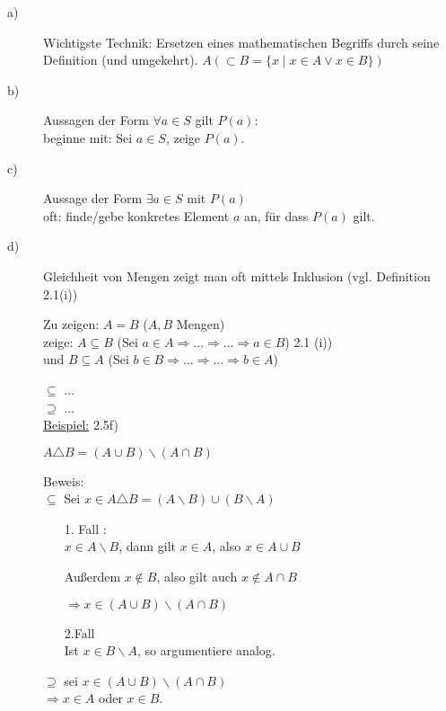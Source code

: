 \documentclass[a4paper, 12pt, twoside] {article}
\begin{document}
\begin{description}
\item[a)]
Wichtigste Technik: Ersetzen eines mathematischen Begriffs durch seine Definition (und umgekehrt).
$A( \subset B = \{x \mid x \in A \lor x \in B\})$

\item[b)]
Aussagen der Form $\forall a \in S$ gilt $P(a)$: \\
beginne mit: Sei $a \in S$, zeige $P(a)$.

\item[c)]
Aussage der Form $\exists a \in S$ mit $P(a)$ \\
oft: finde/gebe konkretes Element $a$ an, für dass $P(a)$ gilt.

\item[d)]
Gleichheit von Mengen zeigt man oft mittels Inklusion (vgl. Definition 2.1(i))

Zu zeigen: $A = B$ ($A, B$ Mengen) \\
zeige: $A \subseteq B$ (Sei $a \in A \Rightarrow ... \Rightarrow ... \Rightarrow a \in B$) 2.1 (i)) \\
und $B \subseteq A$ (Sei $b \in B \Rightarrow ... \Rightarrow ... \Rightarrow b \in A$)

\textit{$\subseteq$} ...\\
\textit{$\supseteq$} ... \\

\underline{Beispiel:} 2.5f)

$A \triangle B = (A \cup B) \backslash (A \cap B)$

Beweis: \\
\textit{$\subseteq$} Sei $x \in A \triangle B = (A \backslash B) \cup (B \backslash A)$

\begin{itemize}
\item[1. Fall]: \hfill \\
$x \in A \backslash B$, dann gilt $x \in A$, also $x \in A \cup B$

Außerdem $x \notin B$, also gilt auch $x \notin A \cap B$

$\Rightarrow x \in (A \cup B) \backslash (A \cap B)$

\item[2.Fall] \hfill \\
Ist $ x \in B \backslash A$, so argumentiere analog.
\end{itemize}

\textit{$\supseteq$} sei $x \in (A \cup B) \backslash (A \cap B)$ \\
$\Rightarrow x \in A$ oder $x \in B$.


\end{description}
\end{document}
